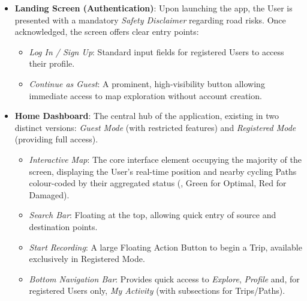 \begin{itemize}
    \item \textbf{Landing Screen (Authentication)}: 
    Upon launching the app, the User is presented with a mandatory \emph{Safety Disclaimer} regarding road risks. Once acknowledged, the screen offers clear entry points:
        \begin{itemize}
            \item \emph{Log In / Sign Up}: Standard input fields for registered Users to access their profile.
            \item \emph{Continue as Guest}: A prominent, high-visibility button allowing immediate access to map exploration without account creation.
        \end{itemize}

    \item \textbf{Home Dashboard}: 
    The central hub of the application, existing in two distinct versions: \emph{Guest Mode} (with restricted features) and \emph{Registered Mode} (providing full access).
        \begin{itemize}
            \item \emph{Interactive Map}: The core interface element occupying the majority of the screen, displaying the User's real-time position and nearby cycling Paths colour-coded by their aggregated status (\eg, Green for Optimal, Red for Damaged).
            \item \emph{Search Bar}: Floating at the top, allowing quick entry of source and destination points.
            \item \emph{Start Recording}: A large Floating Action Button to begin a Trip, available exclusively in Registered Mode.
            \item \emph{Bottom Navigation Bar}: Provides quick access to \emph{Explore}, \emph{Profile} and, for registered Users only, \emph{My Activity} (with subsections for Trips/Paths).
        \end{itemize}


\end{itemize}
